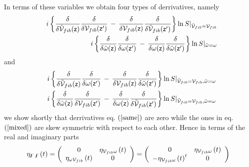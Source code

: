 In terms of these variables we obtain four types of derrivatives, namely%
\begin{eqnarray}
&&i\left\{ \frac{\delta }{\delta {\cal \tilde{V}}_{fib}({\sf z})}\frac{%
\delta }{\delta {\cal V}_{fib}({\sf z}^{\prime })}\,-\,\frac{\delta }{\delta 
{\cal V}_{fib}({\sf z})}\frac{\delta }{\delta {\cal \tilde{V}}_{fib}({\sf z}%
^{\prime })}\right\} \ln S|_{{\cal \tilde{V}}_{fib}={\cal V}_{fib}} 
\nonumber \\
&&i\left\{ \frac{\delta }{\delta {\cal \tilde{\omega}}({\sf z})}\frac{\delta 
}{\delta {\cal \omega }({\sf z}^{\prime })}\,-\,\frac{\delta }{\delta {\cal %
\omega }({\sf z})}\frac{\delta }{\delta {\cal \tilde{\omega}}({\sf z}%
^{\prime })}\right\} \ln S|_{{\cal \tilde{\omega}}={\cal \omega }}
\label{same}
\end{eqnarray}%
and%
\begin{eqnarray}
&&i\left\{ \frac{\delta }{\delta {\cal \tilde{V}}_{fib}({\sf z})}\frac{%
\delta }{\delta {\cal \omega }({\sf z}^{\prime })}\,-\,\frac{\delta }{\delta 
{\cal V}_{fib}({\sf z})}\frac{\delta }{\delta {\cal \tilde{\omega}}({\sf z}%
^{\prime })}\right\} \ln S|_{{\cal \tilde{V}}_{fib}={\cal V}_{fib},{\cal 
\tilde{\omega}}={\cal \omega }}  \nonumber \\
&&i\left\{ \frac{\delta }{\delta {\cal \tilde{\omega}}({\sf z})}\frac{\delta 
}{\delta {\cal V}_{fib}({\sf z}^{\prime })}\,-\,\frac{\delta }{\delta {\cal %
\omega }({\sf z})}\frac{\delta }{\delta {\cal \tilde{V}}_{fib}({\sf z}%
^{\prime })}\right\} \ln S|_{{\cal \tilde{V}}_{fib}={\cal V}_{fib},{\cal 
\tilde{\omega}}={\cal \omega }}  \label{mixed}
\end{eqnarray}%
we show shortly that derrivatives eq. $\left( \ref{same}\right) $ are zero
while the ones in eq. $\left( \ref{mixed}\right) $ are skew symmetric with
respect to each other. Hence in terms of the real and imaginary parts 
\begin{equation}
\eta _{{\bf \digamma \,\digamma }}(t)=\left( 
\begin{array}{cc}
0 & \eta _{{\cal V}_{fib}\omega }\left( t\right) \\ 
\eta _{\omega {\cal V}_{fib}}\left( t\right) & 0%
\end{array}%
\right) =\left( 
\begin{array}{cc}
0 & \eta _{{\cal V}_{fib}\omega }\left( t\right) \\ 
-\eta _{{\cal V}_{fib}\omega }\left( t\right) ^{t} & 0%
\end{array}%
\right)  \label{reim}
\end{equation}%
